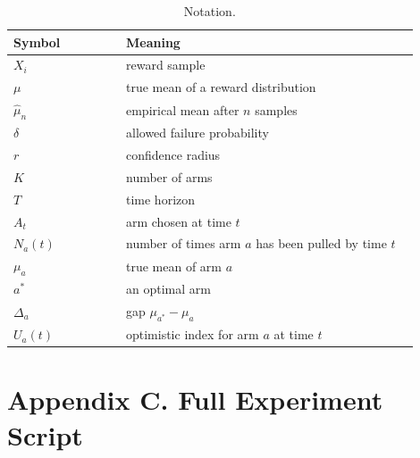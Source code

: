 \documentclass[en,nofont,11pt]{elegantbook}
\begin{document}
\begin{table}[H]
\centering
\caption{Notation.}
\begin{tabular}{p{0.25\linewidth}p{0.65\linewidth}}
\toprule
Symbol & Meaning \\
\midrule
$X_i$ & reward sample \\
$\mu$ & true mean of a reward distribution \\
$\widehat\mu_n$ & empirical mean after $n$ samples \\
$\delta$ & allowed failure probability \\
$r$ & confidence radius \\
$K$ & number of arms \\
$T$ & time horizon \\
$A_t$ & arm chosen at time $t$ \\
$N_a(t)$ & number of times arm $a$ has been pulled by time $t$ \\
$\mu_a$ & true mean of arm $a$ \\
$a^*$ & an optimal arm \\
$\Delta_a$ & gap $\mu_{a^*}-\mu_a$ \\
$U_a(t)$ & optimistic index for arm $a$ at time $t$ \\
\bottomrule
\end{tabular}
\end{table}

\chapter*{Appendix C. Full Experiment Script}



\backmatter
\nocite{lattimore2020bandit,bubeck2012,auer2002,boucheron2013concentration,audibert2009variance}
\printbibliography[heading=bibintoc,title={References}]
\end{document}
